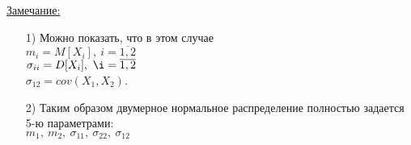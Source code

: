 \underline{Замечание:}
\begin{enumerate}
	\item[1)] Можно показать, что в этом случае\\
	$m_i = M[X_i], \ i = \overline{1, 2}$\\
	$\sigma_{ii} = D[X_i], \ \i = \overline{1, 2}$\\
	$\sigma_{12} = cov(X_1, X_2)$.
	
	\item[2)] Таким образом двумерное нормальное распределение полностью задается 5-ю параметрами:\\
	$m_1, \ m_2, \ \sigma_{11}, \ \sigma_{22}, \ \sigma_{12}$
\end{enumerate}
